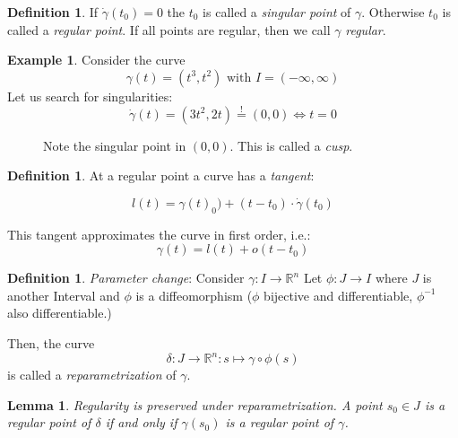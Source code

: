 \documentclass[a4paper,11pt,notitlepage,fullpage]{paper}
\theoremstyle{plain}
\newtheorem{lem}[thm]{Lemma}
\theoremstyle{definition}
\newtheorem{defn}[thm]{Definition} %
\newtheorem{exmp}[thm]{Example} %
\begin{document}
\begin{defn}
If $\dot\gamma(t_0) = 0$ the $t_0$ is called a \emph{singular point} of $\gamma$. Otherwise $t_0$ is called a \emph{regular point}. If all points are regular, then we call $\gamma$ \emph{regular}.
\end{defn}

\begin{exmp}
Consider the curve
\begin{equation*}
\gamma(t) = (t^3, t^2) \text{ with } I = (-\infty, \infty)
\end{equation*}
Let us search for singularities:
\begin{equation*}
\dot\gamma(t) = (3t^2, 2t) \stackrel{!}{=} (0,0) \Leftrightarrow t = 0
\end{equation*}

\begin{figure}[H]
\centering
\def\svgwidth{0.7\textwidth}

\caption{Note the singular point in $(0,0)$. This is called a \emph{cusp}.}
\label{fig:cusp}
\end{figure}
\end{exmp}


\begin{defn}
At a regular point a curve has a \emph{tangent}:

\begin{equation*}
l(t) = \gamma(t)_0) + (t-t_0) \cdot \dot\gamma(t_0)
\end{equation*}

This tangent approximates the curve in first order, i.e.:
\begin{equation*}
\gamma(t) = l(t) + o(t-t_0)
\end{equation*}

\end{defn}


\begin{defn}
\emph{Parameter change}: Consider $\gamma: I \to \mathbb R^n$ Let $\phi: J \to I$ where $J$ is another Interval and $\phi$ is a diffeomorphism ($\phi$ bijective and differentiable, $\phi^{-1}$ also differentiable.)

Then, the curve
\begin{equation*}
\delta : J \to \mathbb R^n : s \mapsto \gamma \circ \phi(s)
\end{equation*}
is called a \emph{reparametrization} of $\gamma$.
\end{defn}

\begin{lem}
Regularity is preserved under reparametrization. A point $s_0 \in J$ is a regular point of $\delta$ if and only if $\gamma(s_0)$ is a regular point of $\gamma$.
\end{lem}
\end{document}
